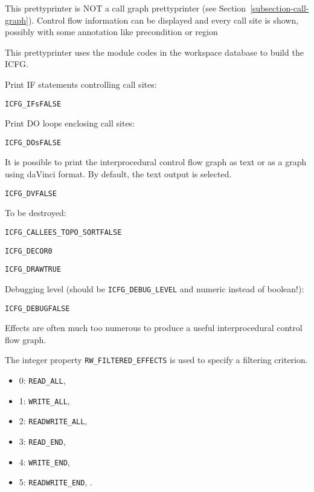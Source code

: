 \documentclass[a4paper]{report}
\newenvironment{PipsProp}{\begin{alltt}}{\end{alltt}}
\begin{document}
This prettyprinter is NOT a call graph prettyprinter (see
Section~\ref{subsection-call-graph}). Control flow information can be
displayed and every call site is shown, possibly with some annotation like
precondition or region

This prettyprinter uses the module codes in the workspace database to
build the ICFG.

Print IF statements controlling call sites:

\begin{PipsProp}
ICFG_IFs FALSE
\end{PipsProp}

Print DO loops enclosing call sites:

\begin{PipsProp}
ICFG_DOs FALSE
\end{PipsProp}

It is possible to print the interprocedural control flow graph as text or
as a graph using daVinci format. By default, the text output is selected.

\begin{PipsProp}
ICFG_DV FALSE
\end{PipsProp}

To be destroyed:

\begin{PipsProp}
ICFG_CALLEES_TOPO_SORT FALSE
\end{PipsProp}

\begin{PipsProp}
ICFG_DECOR 0
\end{PipsProp}

\begin{PipsProp}
ICFG_DRAW TRUE
\end{PipsProp}

Debugging level (should be \verb+ICFG_DEBUG_LEVEL+ and numeric instead
of boolean!):

\begin{PipsProp}
ICFG_DEBUG FALSE
\end{PipsProp}

Effects are often much too numerous to produce a useful interprocedural
control flow graph.

The integer property \verb/RW_FILTERED_EFFECTS/ is used to specify a
filtering criterion.
\begin{itemize}
\item 0: \verb/READ_ALL/,
\item 1: \verb/WRITE_ALL/,
\item 2: \verb/READWRITE_ALL/,
\item 3: \verb/READ_END/,
\item 4: \verb/WRITE_END/,
\item 5: \verb/READWRITE_END/, .
\end{itemize}
\end{document}
